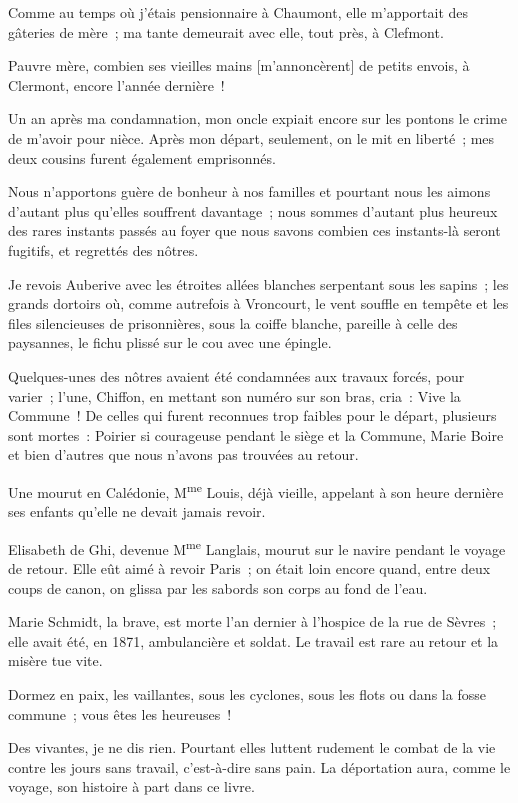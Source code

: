 \documentclass[french,twoside]{book} %
\newcommand\corr[1]{#1}
\begin{document}
Comme au temps où j’étais pensionnaire à Chaumont, elle m’apportait des gâteries de mère ; ma tante demeurait avec elle, tout près, à Clefmont.\par
Pauvre mère, combien ses vieilles mains [{\corr m’annoncèrent}] de petits envois, à Clermont, encore l’année dernière !\par
Un an après ma condamnation, mon oncle expiait encore sur les pontons le crime de m’avoir  pour nièce. Après mon départ, seulement, on le mit en liberté ; mes deux cousins furent également emprisonnés.\par
Nous n’apportons guère de bonheur à nos familles et pourtant nous les aimons d’autant plus qu’elles souffrent davantage ; nous sommes d’autant plus heureux des rares instants passés au foyer que nous savons combien ces instants-là seront fugitifs, et regrettés des nôtres.\par
Je revois Auberive avec les étroites allées blanches serpentant sous les sapins ; les grands dortoirs où, comme autrefois à Vroncourt, le vent souffle en tempête et les files silencieuses de prisonnières, sous la coiffe blanche, pareille à celle des paysannes, le fichu plissé sur le cou avec une épingle.\par
Quelques-unes des nôtres avaient été condamnées aux travaux forcés, pour varier ; l’une, Chiffon, en mettant son numéro sur son bras, cria : Vive la Commune ! De celles qui furent reconnues trop faibles pour le départ, plusieurs sont mortes : Poirier si courageuse pendant le siège et la Commune, Marie Boire et bien d’autres que nous n’avons pas trouvées au retour.\par
Une mourut en Calédonie, M\textsuperscript{me} Louis, déjà vieille, appelant à son heure dernière ses enfants qu’elle ne devait jamais revoir.\par
 Elisabeth de Ghi, devenue M\textsuperscript{me} Langlais, mourut sur le navire pendant le voyage de retour. Elle eût aimé à revoir Paris ; on était loin encore quand, entre deux coups de canon, on glissa par les sabords son corps au fond de l’eau.\par
Marie Schmidt, la brave, est morte l’an dernier à l’hospice de la rue de Sèvres ; elle avait été, en 1871, ambulancière et soldat. Le travail est rare au retour et la misère tue vite.\par
Dormez en paix, les vaillantes, sous les cyclones, sous les flots ou dans la fosse commune ; vous êtes les heureuses !\par
Des vivantes, je ne dis rien. Pourtant elles luttent rudement le combat de la vie contre les jours sans travail, c’est-à-dire sans pain. La déportation aura, comme le voyage, son histoire à part dans ce livre.\par
\end{document}
